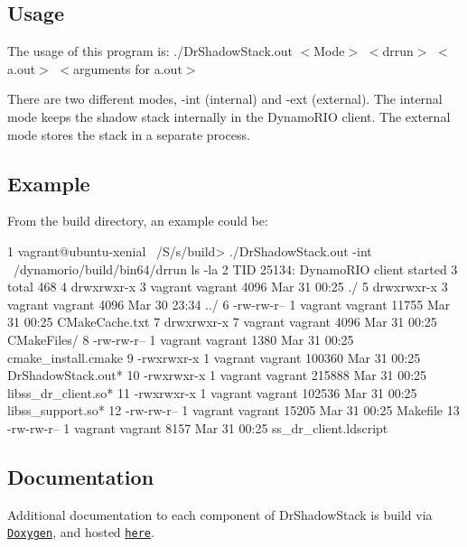 \subsection*{Usage}

The usage of this program is\+: {\ttfamily ./\+Dr\+Shadow\+Stack.out $<$Mode$>$ $<$drrun$>$ $<$a.\+out$>$ $<$arguments for a.\+out$>$}

There are two different modes, {\ttfamily -\/int} (internal) and {\ttfamily -\/ext} (external). The internal mode keeps the shadow stack internally in the Dynamo\+R\+IO client. The external mode stores the stack in a separate process.

\subsection*{Example}

From the build directory, an example could be\+: 
\begin{DoxyCode}
1 vagrant@ubuntu-xenial ~/S/s/build> ./DrShadowStack.out -int ~/dynamorio/build/bin64/drrun ls -la
2 TID 25134: DynamoRIO client started
3 total 468
4 drwxrwxr-x 3 vagrant vagrant   4096 Mar 31 00:25 ./
5 drwxrwxr-x 3 vagrant vagrant   4096 Mar 30 23:34 ../
6 -rw-rw-r-- 1 vagrant vagrant  11755 Mar 31 00:25 CMakeCache.txt
7 drwxrwxr-x 7 vagrant vagrant   4096 Mar 31 00:25 CMakeFiles/
8 -rw-rw-r-- 1 vagrant vagrant   1380 Mar 31 00:25 cmake\_install.cmake
9 -rwxrwxr-x 1 vagrant vagrant 100360 Mar 31 00:25 DrShadowStack.out*
10 -rwxrwxr-x 1 vagrant vagrant 215888 Mar 31 00:25 libss\_dr\_client.so*
11 -rwxrwxr-x 1 vagrant vagrant 102536 Mar 31 00:25 libss\_support.so*
12 -rw-rw-r-- 1 vagrant vagrant  15205 Mar 31 00:25 Makefile
13 -rw-rw-r-- 1 vagrant vagrant   8157 Mar 31 00:25 ss\_dr\_client.ldscript
\end{DoxyCode}


\subsection*{Documentation}

Additional documentation to each component of Dr\+Shadow\+Stack is build via \href{http://www.stack.nl/~dimitri/doxygen/}{\tt Doxygen}, and hosted \href{https://zwimer.com/DrShadowStack}{\tt here}. 